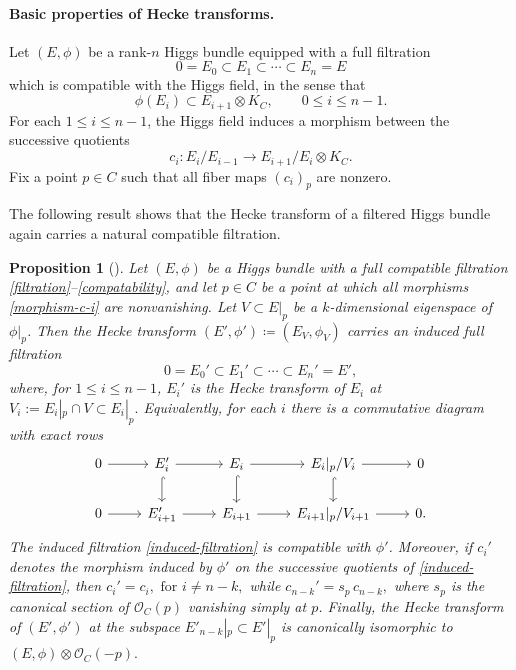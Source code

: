 \documentclass[twoside, 11pt]{article}
\numberwithin{equation}{section}
\theoremstyle{theorem}
\numberwithin{theorem}{section}
\newtheorem{proposition}[proposition]{Proposition}
\theoremstyle{definition}
\begin{document}
\paragraph{Basic properties of Hecke transforms.}
Let \((E,\phi)\) be a rank-\(n\) Higgs bundle equipped with a full filtration
\begin{equation}\label{filtration}
0=E_0\subset E_1\subset \cdots \subset E_n=E
\end{equation}
which is compatible with the Higgs field, in the sense that
\begin{equation}\label{compatability}
\phi(E_i)\subset E_{i+1}\otimes K_C,
\qquad 0\le i\le n-1.
\end{equation}
For each \(1\le i\le n-1\), the Higgs field induces a morphism between the successive quotients
\begin{equation}\label{morphism-c-i}
c_i:{E_i}/{E_{i-1}}
\longrightarrow
{E_{i+1}}/{E_i}\otimes K_C.
\end{equation}
Fix a point \(p\in C\) such that all fiber maps \((c_i)_p\) are nonzero.

The following result shows that the Hecke transform of a filtered Higgs bundle again carries a natural compatible filtration.

\begin{proposition}[{\cite[Proposition~4.5]{HH22}}]\label{HH-Hecke-prop}
Let \((E,\phi)\) be a Higgs bundle with a full compatible filtration
\eqref{filtration}--\eqref{compatability}, and let \(p\in C\) be a point at which all morphisms
\eqref{morphism-c-i} are nonvanishing.
Let \(V\subset E|_p\) be a \(k\)-dimensional eigenspace of \(\phi|_p\).
Then the Hecke transform
\(
(E',\phi') \coloneqq (E_V, \phi_V)
\)
carries an induced full filtration
\begin{equation}\label{induced-filtration}
0=E_0'\subset E_1'\subset \cdots \subset E_n'=E',
\end{equation}
where, for \(1\le i\le n-1\), \(E_i'\) is the Hecke transform of \(E_i\) at
\(
V_i:=E_i|_p\cap V\subset E_i|_p.
\)
Equivalently, for each \(i\) there is a commutative diagram with exact rows
\[
\begin{tikzcd}
0 \arrow{r} & E_i' \arrow{r} \arrow[hook]{d} & E_i \arrow{r} \arrow[hook]{d}
& E_i|_p/V_i \arrow{r} \arrow[hook]{d} & 0 \\
0 \arrow{r} & E_{i+1}' \arrow{r} & E_{i+1} \arrow{r}
& E_{i+1}|_p/V_{i+1} \arrow{r} & 0 .
\end{tikzcd}
\]
The induced filtration \eqref{induced-filtration} is compatible with \(\phi'\).
Moreover, if \(c_i'\) denotes the morphism induced by \(\phi'\) on the successive quotients of
\eqref{induced-filtration}, then \( c_i'=c_i, \text{ for } i\neq n-k,\)
while \( c_{n-k}'=s_p\,c_{n-k},\)
where \(s_p\) is the canonical section of \(\mathcal O_C(p)\) vanishing simply at \(p\).
Finally, the Hecke transform of \((E',\phi')\) at the subspace \(E'_{n-k}|_p\subset E'|_p\) is
canonically isomorphic to
\(
(E,\phi)\otimes \mathcal O_C(-p).
\)
\end{proposition}
\end{document}
